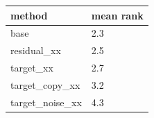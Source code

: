 \begin{tabular}{ll}
\toprule
method & mean rank \\
\midrule
base & 2.3 \\
residual\_xx & 2.5 \\
target\_xx & 2.7 \\
target\_copy\_xx & 3.2 \\
target\_noise\_xx & 4.3 \\
\bottomrule
\end{tabular}
